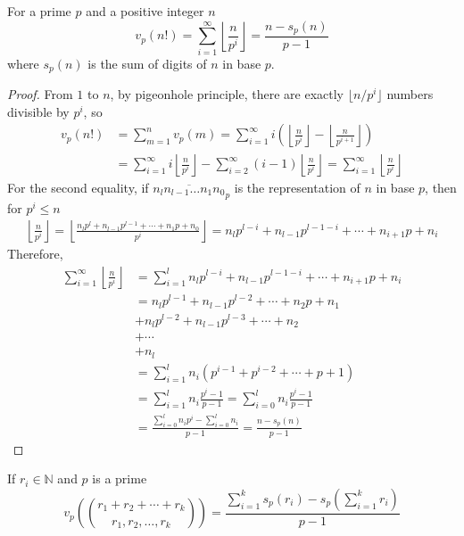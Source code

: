 \documentclass{treatise}
\begin{document}
\begin{proposition}
For a prime $p$ and a positive integer $n$
$$v_p (n!) = \sum_{i = 1}^\infty \left\lfloor \frac{n}{p^i} \right\rfloor = \frac{n - s_p(n)}{p - 1}$$
where $s_p(n)$ is the sum of digits of $n$ in base $p$.
\end{proposition}
\begin{proof}
From $1$ to $n$, by pigeonhole principle, there are exactly $\lfloor n/p^i \rfloor$ numbers divisible by $p^i$, so
\begin{align*}
v_p (n!) & = \sum_{m = 1}^n v_p (m) = \sum_{i = 1}^\infty i \left( \left\lfloor \frac{n}{p^i} \right\rfloor - \left\lfloor \frac{n}{p^{i + 1}} \right\rfloor \right) \\
& = \sum_{i = 1}^\infty i \left\lfloor \frac{n}{p^i} \right\rfloor - \sum_{i = 2}^\infty (i - 1) \left\lfloor \frac{n}{p^i} \right\rfloor = \sum_{i = 1}^\infty \left\lfloor \frac{n}{p^i} \right\rfloor
\end{align*}
For the second equality, if $\overline{n_l n_{l - 1} \hdots n_1 n_0}_p$ is the representation of $n$ in base $p$, then for $p^i \leq n$
\begin{align*}
\left\lfloor \frac{n}{p^i} \right\rfloor = \left\lfloor \frac{n_l p^l + n_{l - 1} p^{l - 1} + \cdots + n_1 p + n_0}{p^i} \right\rfloor = n_l p^{l - i} + n_{l - 1} p^{l - 1 - i} + \cdots + n_{i + 1} p + n_i
\end{align*}
Therefore,
\begin{align*}
\sum_{i = 1}^\infty \left\lfloor \frac{n}{p^i} \right\rfloor & = \sum_{i = 1}^l n_l p^{l - i} + n_{l - 1} p^{l - 1 - i} + \cdots + n_{i + 1} p + n_i \\
& = n_l p^{l - 1} + n_{l - 1} p^{l - 2} + \cdots + n_2 p + n_1 \\
& + n_l p^{l - 2} + n_{l - 1} p^{l - 3} + \cdots + n_2 \\
& + \cdots \\
& + n_l \\
& = \sum_{i = 1}^l n_i (p^{i - 1} + p^{i - 2} + \cdots + p + 1) \\
& = \sum_{i = 1}^l n_i \frac{p^i - 1}{p - 1} = \sum_{i = 0}^l n_i \frac{p^i - 1}{p - 1} \\
& = \frac{\sum_{i = 0}^l n_i p^i - \sum_{i = 0}^l n_i}{p - 1} = \frac{n - s_p (n)}{p - 1}
\end{align*}
\end{proof}
\begin{corollary} \label{multi-val-sum-digit}
If $r_i \in \mathbb{N}$ and $p$ is a prime
$$v_p \left( {r_1 + r_2 + \cdots + r_k \choose r_1, r_2, \hdots, r_k} \right) = \frac{\sum_{i = 1}^k s_p(r_i) - s_p \left( \sum_{i = 1}^k r_i \right)}{p - 1}$$
\end{corollary}
\end{document}
